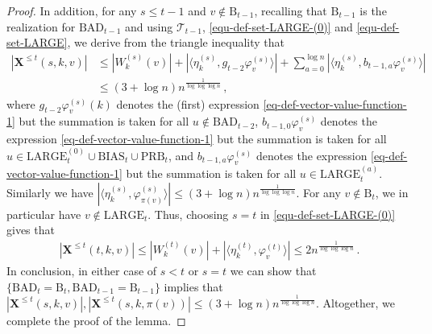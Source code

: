 \documentclass[11pt]{article}
\numberwithin{equation}{section}
\begin{document}
\begin{proof}
In addition, for any $s \leq t-1$ and $v \not \in \mathrm{B}_{t-1}$, recalling that $\mathrm{B}_{t-1}$ is the realization for $\mathrm{BAD}_{t-1}$ and using $\mathcal{T}_{t-1}$, \eqref{equ-def-set-LARGE-(0)} and \eqref{equ-def-set-LARGE}, we derive from the triangle inequality that 
\begin{align}
    | \mathbf{X}^{\leq t}(s,k,v) | & \leq |W^{(s)}_k(v)| + | \langle \eta^{(s)}_k, g_{t-2} \varphi^{(s)}_v \rangle | + \sum_{a=0}^{\log n} | \langle \eta^{(s)}_k, b_{t-1,a} \varphi^{(s)}_v \rangle | \nonumber \\ & 
    \leq (3+\log n) n^{\frac{1}{\log \log \log n}}  \,, \label{equ-bound-degree-time-s<t-not-BAD}
\end{align}
where $g_{t-2} \varphi^{(s)}_v (k)$ denotes the (first) expression \eqref{eq-def-vector-value-function-1} but the summation is taken for all $u \not \in\mathrm{BAD}_{t-2}$, $b_{t-1,0} \varphi^{(s)}_v$ denotes the expression \eqref{eq-def-vector-value-function-1} but the summation is taken for all $u\in \mathrm{LARGE}^{(0)}_t \cup \mathrm{BIAS}_t \cup \mathrm{PRB}_t$, and $b_{t-1,a} \varphi^{(s)}_v$ denotes the expression \eqref{eq-def-vector-value-function-1} but the summation is taken for all $u\in \mathrm{LARGE}^{(a)}_t$.
Similarly we have $| \langle \eta^{(s)}_k, \varphi^{(s)}_{\pi(v)} \rangle | \leq  (3+\log n) n^{\frac{1}{\log \log \log n}}$. For any $v \not \in \mathrm{B}_t$, we in particular have $v \not \in \mathrm{LARGE}_t$. Thus, choosing $s=t$ in \eqref{equ-def-set-LARGE-(0)} gives that
\begin{align}
    |\mathbf{X}^{\leq t}(t,k,v)| \leq |W^{(t)}_k(v)| + | \langle \eta^{(t)}_k, \varphi^{(t)}_v \rangle | \leq 2 n^{\frac{1}{\log \log \log n}} \,. \label{equ-bound-degree-time-t-not-in-BAD}
\end{align}
In conclusion, in either case of $s<t$ or $s=t$ we can show that $\{ \mathrm{BAD}_t = \mathrm{B}_t, \mathrm{BAD}_{t-1} = \mathrm{B}_{t-1} \}$ implies that $| \mathbf{X}^{\leq t} (s,k,v) |, | \mathbf{X}^{\leq t} (s,k,\pi(v)) | \leq (3+\log n) n^{ \frac{1}{\log \log \log n} }$. Altogether, we complete the proof of the lemma.
\end{proof}
\end{document}
